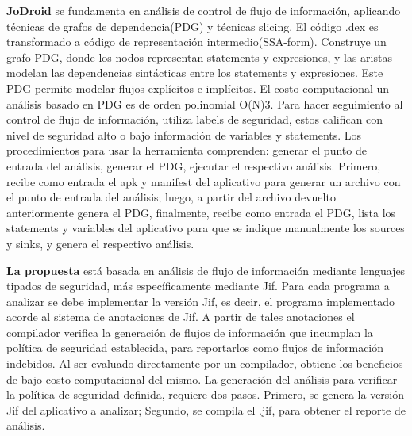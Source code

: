 \textbf{JoDroid} se fundamenta en análisis de control de flujo de información,
aplicando técnicas de grafos de dependencia(PDG) y técnicas slicing.\newline 
El código .dex es transformado a código de representación intermedio(SSA-form).
Construye un grafo PDG, donde los nodos representan statements y expresiones, y
las aristas modelan las dependencias sintácticas entre los statements y
expresiones. Este PDG permite modelar flujos explícitos e implícitos.\newline
El costo computacional un análisis basado en PDG es de orden polinomial
O(N)3\cite[page 3]{FCO-PDG}.\newline 
Para hacer seguimiento al control de flujo de información, utiliza labels de
seguridad, estos califican con nivel de seguridad alto o bajo información de
variables y statements.\newline
Los procedimientos para usar la herramienta comprenden: generar el punto de
entrada del análisis, generar el PDG, ejecutar el respectivo análisis. Primero,
recibe como entrada el apk y manifest del aplicativo para generar un archivo con
el punto de entrada del análisis; luego, a partir del archivo devuelto
anteriormente genera el PDG, finalmente, recibe como entrada el PDG, lista los
statements y variables del aplicativo para que se indique manualmente los
sources y sinks, y genera el respectivo análisis.

\textbf{La propuesta} está basada en análisis de flujo de información mediante
lenguajes tipados de seguridad, más específicamente mediante Jif.\newline
Para cada programa a analizar se debe implementar la versión Jif, es decir,
el programa implementado acorde al sistema de anotaciones de Jif. A
partir de tales anotaciones el compilador verifica la generación de flujos de
información que incumplan la política de seguridad establecida, para reportarlos
como flujos de información indebidos. 
Al ser evaluado directamente por un
compilador, obtiene los beneficios de bajo costo computacional del mismo.\newline
La generación del análisis para verificar la política de seguridad
definida, requiere dos pasos. Primero, se genera la versión Jif del aplicativo a
analizar; Segundo, se compila el .jif, para obtener el reporte de análisis.

